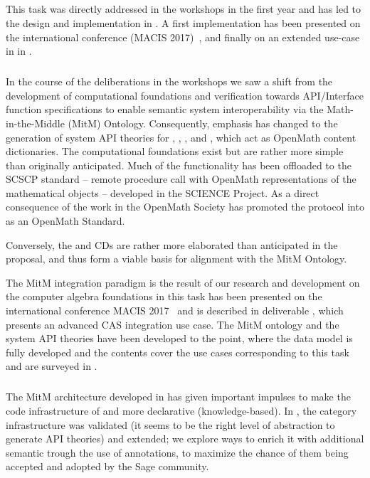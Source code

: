 \subparagraph{}

This task was directly addressed in the  workshops in the first year and has led to the design and implementation in . A first implementation has been presented on the international conference (MACIS 2017)~\cite{WieKohRab:vtuimkb17}, and finally on an extended use-case in \LMFDB in .
 \medskip

\subparagraph{}

In the course of the deliberations in the  workshops we saw a shift from the development of computational foundations and verification towards API/Interface function specifications to enable semantic system interoperability via the Math-in-the-Middle (MitM) Ontology.
Consequently, emphasis has changed to the generation of system API theories for \GAP, \Sage, \Singular, and \LMFDB, which act as OpenMath content dictionaries.
The computational foundations exist but are rather more simple than originally anticipated.
Much of the functionality has been offloaded to the SCSCP standard -- remote procedure call with OpenMath representations of the mathematical objects -- developed in the SCIENCE Project.
As a direct consequence of the work in \pn the OpenMath Society has promoted the \SCSCP protocol into as an OpenMath Standard.

Conversely, the \GAP and \Sage CDs are rather more elaborated than anticipated in the proposal, and thus form a viable basis for alignment with the MitM Ontology.

The MitM integration paradigm is the result of our research and development on the computer algebra foundations in this task has been presented on the international conference MACIS 2017~\cite{KohMuePfe:kbimss17} and is described in deliverable , which presents an advanced CAS integration use case. 
The MitM ontology and the system API theories have been developed to the point, where the data model is fully developed and the contents cover the use cases corresponding to this task and  are surveyed in .
\medskip

\subparagraph{}

The MitM architecture developed in  has given important impulses to make the code infrastructure of \Sage and \GAP more declarative (knowledge-based).
In \Sage, the category infrastructure was validated (it seems to be the right level of abstraction to generate API theories) and extended; we explore ways to enrich it with additional semantic
trough the use of annotations, to maximize the chance of
them being accepted and adopted by the Sage community.

